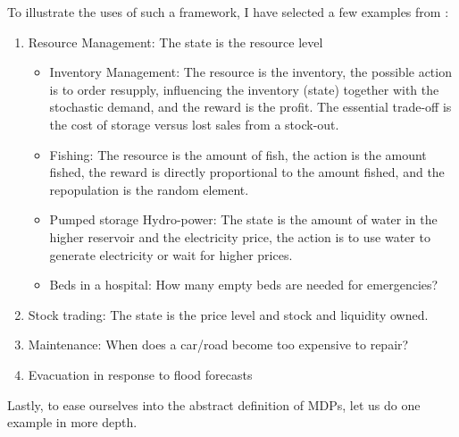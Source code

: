 To illustrate the uses of such a framework, I have selected a few examples from \textcite{whiteRealApplicationsMarkov1985}: 
\begin{enumerate}
	\item Resource Management: The state is the resource level
	\begin{itemize}
		\item Inventory Management: The resource is the inventory, the possible action is to order resupply, influencing the inventory (state) together with the stochastic demand, and the reward is the profit. The essential trade-off is the cost of storage versus lost sales from a stock-out.
		\item Fishing: The resource is the amount of fish, the action is the amount fished, the reward is directly proportional to the amount fished, and the repopulation is the random element.
		\item Pumped storage Hydro-power: The state is the amount of water in the higher reservoir and the electricity price, the action is to use water to generate electricity or wait for higher prices.
		\item Beds in a hospital: How many empty beds are needed for emergencies?
	\end{itemize}
	\item Stock trading: The state is the price level and stock and liquidity owned.
	\item Maintenance: When does a car/road become too expensive to repair?
	\item Evacuation in response to flood forecasts
\end{enumerate}
Lastly, to ease ourselves into the abstract definition of MDPs, let us do one example in more depth.
